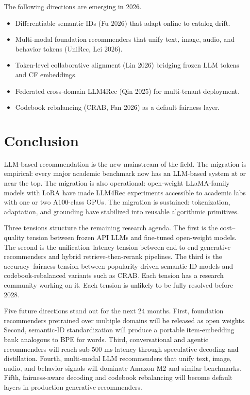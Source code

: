 The following directions are emerging in 2026.

\begin{itemize}
\tightlist
\item
  Differentiable semantic IDs (Fu 2026) that adapt online to catalog drift.
\item
  Multi-modal foundation recommenders that unify text, image, audio, and behavior tokens (UniRec, Lei 2026).
\item
  Token-level collaborative alignment (Lin 2026) bridging frozen LLM tokens and CF embeddings.
\item
  Federated cross-domain LLM4Rec (Qin 2025) for multi-tenant deployment.
\item
  Codebook rebalancing (CRAB, Fan 2026) as a default fairness layer.
\end{itemize}

\section{Conclusion}\label{conclusion}

LLM-based recommendation is the new mainstream of the field. The migration is empirical: every major academic benchmark now has an LLM-based system at or near the top. The migration is also operational: open-weight LLaMA-family models with LoRA have made LLM4Rec experiments accessible to academic labs with one or two A100-class GPUs. The migration is sustained: tokenization, adaptation, and grounding have stabilized into reusable algorithmic primitives.

Three tensions structure the remaining research agenda. The first is the cost--quality tension between frozen API LLMs and fine-tuned open-weight models. The second is the unification--latency tension between end-to-end generative recommenders and hybrid retrieve-then-rerank pipelines. The third is the accuracy--fairness tension between popularity-driven semantic-ID models and codebook-rebalanced variants such as CRAB. Each tension has a research community working on it. Each tension is unlikely to be fully resolved before 2028.

Five future directions stand out for the next 24 months. First, foundation recommenders pretrained over multiple domains will be released as open weights. Second, semantic-ID standardization will produce a portable item-embedding bank analogous to BPE for words. Third, conversational and agentic recommenders will reach sub-500 ms latency through speculative decoding and distillation. Fourth, multi-modal LLM recommenders that unify text, image, audio, and behavior signals will dominate Amazon-M2 and similar benchmarks. Fifth, fairness-aware decoding and codebook rebalancing will become default layers in production generative recommenders.

